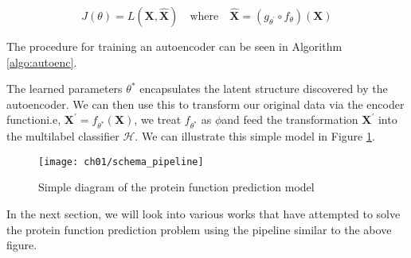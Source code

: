 \[
    J(\theta) = L(\mathbf{X}, \mathbf{\widehat{X}}) \quad \text{where} \quad
    \mathbf{\widehat{X}} = (g_{\theta^{\prime}} \circ f_{\theta}) (\mathbf{X})
\]

The procedure for training an autoencoder can be seen in Algorithm
\ref{algo:autoenc}.



The learned parameters $\theta^{\ast}$ encapsulates the latent structure
discovered by the autoencoder. We can then use this to transform our original
data via the encoder function\textemdash i.e, $ \mathbf{X}^{\prime} =
f_{\theta^{\ast}}(\mathbf{X})$, we treat $f_{\theta^{\ast}}$ as
$\phi$\textemdash and feed the transformation $\mathbf{X}^{\prime}$ into the
multilabel classifier $\mathcal{H}$. We can illustrate this simple model
in Figure \ref{schema:pipeline}.

\begin{figure}[!h]
  \centering
  \texttt{[image: ch01/schema\_pipeline]}
  \caption{Simple diagram of the protein function prediction model}
  \label{schema:pipeline}
\end{figure}

In the next section, we will look into various works that have attempted to
solve the protein function prediction problem using the pipeline similar to
the above figure.